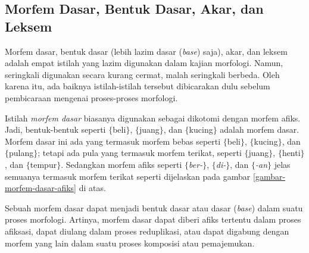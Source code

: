


\subsection{Morfem Dasar, Bentuk Dasar, Akar, dan Leksem}
\label{sec:morfemDasarDLL}

Morfem dasar, bentuk dasar (lebih lazim dasar (\textit{base}) saja), akar, dan leksem adalah empat istilah yang lazim digunakan dalam kajian morfologi. Namun, seringkali digunakan secara kurang cermat, malah seringkali berbeda. Oleh karena itu, ada baiknya istilah-istilah tersebut dibicarakan dulu sebelum pembicaraan mengenai proses-proses morfologi.

Istilah \textit{morfem dasar} biasanya digunakan sebagai dikotomi dengan morfem afiks. Jadi, bentuk-bentuk seperti $\lbrace$beli$\rbrace$, $\lbrace$juang$\rbrace$, dan $\lbrace$kucing$\rbrace$ adalah morfem dasar. Morfem dasar ini ada yang termasuk morfem bebas seperti $\lbrace$beli$\rbrace$, $\lbrace$kucing$\rbrace$, dan $\lbrace$pulang$\rbrace$; tetapi ada pula yang termasuk morfem terikat, seperti $\lbrace$juang$\rbrace$, $\lbrace$henti$\rbrace$, dan $\lbrace$tempur$\rbrace$. Sedangkan morfem afiks seperti \textit{$\lbrace$ber-$\rbrace$}, \textit{$\lbrace$di-$\rbrace$}, dan \textit{$\lbrace$-an$\rbrace$} jelas semuanya termasuk morfem terikat seperti dijelaskan pada gambar \ref{gambar-morfem-dasar-afiks} di atas.

Sebuah morfem dasar dapat menjadi bentuk dasar atau dasar (\textit{base}) dalam suatu proses morfologi. Artinya, morfem dasar dapat diberi afiks tertentu dalam proses afiksasi, dapat diulang dalam proses reduplikasi, atau dapat digabung dengan morfem yang lain dalam suatu proses komposisi atau pemajemukan.

